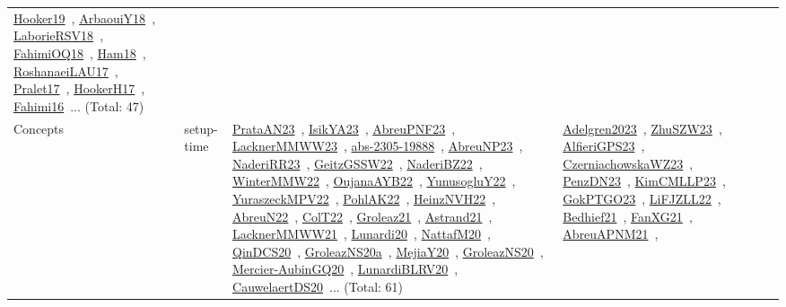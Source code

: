 {\begin{longtable}{lp{3cm}>{\raggedright\arraybackslash}p{6cm}>{\raggedright\arraybackslash}p{6cm}>{\raggedright\arraybackslash}p{8cm}}
\href{../works/Hooker19.pdf}{Hooker19}~\cite{Hooker19}, \href{../works/ArbaouiY18.pdf}{ArbaouiY18}~\cite{ArbaouiY18}, \href{../works/LaborieRSV18.pdf}{LaborieRSV18}~\cite{LaborieRSV18}, \href{../works/FahimiOQ18.pdf}{FahimiOQ18}~\cite{FahimiOQ18}, \href{../works/Ham18.pdf}{Ham18}~\cite{Ham18}, \href{../works/RoshanaeiLAU17.pdf}{RoshanaeiLAU17}~\cite{RoshanaeiLAU17}, \href{../works/Pralet17.pdf}{Pralet17}~\cite{Pralet17}, \href{../works/HookerH17.pdf}{HookerH17}~\cite{HookerH17}, \href{../works/Fahimi16.pdf}{Fahimi16}~\cite{Fahimi16}... (Total: 47)\\
Concepts & setup-time & \href{../works/PrataAN23.pdf}{PrataAN23}~\cite{PrataAN23}, \href{../works/IsikYA23.pdf}{IsikYA23}~\cite{IsikYA23}, \href{../works/AbreuPNF23.pdf}{AbreuPNF23}~\cite{AbreuPNF23}, \href{../works/LacknerMMWW23.pdf}{LacknerMMWW23}~\cite{LacknerMMWW23}, \href{../works/abs-2305-19888.pdf}{abs-2305-19888}~\cite{abs-2305-19888}, \href{../works/AbreuNP23.pdf}{AbreuNP23}~\cite{AbreuNP23}, \href{../works/NaderiRR23.pdf}{NaderiRR23}~\cite{NaderiRR23}, \href{../works/GeitzGSSW22.pdf}{GeitzGSSW22}~\cite{GeitzGSSW22}, \href{../works/NaderiBZ22.pdf}{NaderiBZ22}~\cite{NaderiBZ22}, \href{../works/WinterMMW22.pdf}{WinterMMW22}~\cite{WinterMMW22}, \href{../works/OujanaAYB22.pdf}{OujanaAYB22}~\cite{OujanaAYB22}, \href{../works/YunusogluY22.pdf}{YunusogluY22}~\cite{YunusogluY22}, \href{../works/YuraszeckMPV22.pdf}{YuraszeckMPV22}~\cite{YuraszeckMPV22}, \href{../works/PohlAK22.pdf}{PohlAK22}~\cite{PohlAK22}, \href{../works/HeinzNVH22.pdf}{HeinzNVH22}~\cite{HeinzNVH22}, \href{../works/AbreuN22.pdf}{AbreuN22}~\cite{AbreuN22}, \href{../works/ColT22.pdf}{ColT22}~\cite{ColT22}, \href{../works/Groleaz21.pdf}{Groleaz21}~\cite{Groleaz21}, \href{../works/Astrand21.pdf}{Astrand21}~\cite{Astrand21}, \href{../works/LacknerMMWW21.pdf}{LacknerMMWW21}~\cite{LacknerMMWW21}, \href{../works/Lunardi20.pdf}{Lunardi20}~\cite{Lunardi20}, \href{../works/NattafM20.pdf}{NattafM20}~\cite{NattafM20}, \href{../works/QinDCS20.pdf}{QinDCS20}~\cite{QinDCS20}, \href{../works/GroleazNS20a.pdf}{GroleazNS20a}~\cite{GroleazNS20a}, \href{../works/MejiaY20.pdf}{MejiaY20}~\cite{MejiaY20}, \href{../works/GroleazNS20.pdf}{GroleazNS20}~\cite{GroleazNS20}, \href{../works/Mercier-AubinGQ20.pdf}{Mercier-AubinGQ20}~\cite{Mercier-AubinGQ20}, \href{../works/LunardiBLRV20.pdf}{LunardiBLRV20}~\cite{LunardiBLRV20}, \href{../works/CauwelaertDS20.pdf}{CauwelaertDS20}~\cite{CauwelaertDS20}... (Total: 61) & \href{../works/Adelgren2023.pdf}{Adelgren2023}~\cite{Adelgren2023}, \href{../works/ZhuSZW23.pdf}{ZhuSZW23}~\cite{ZhuSZW23}, \href{../works/AlfieriGPS23.pdf}{AlfieriGPS23}~\cite{AlfieriGPS23}, \href{../works/CzerniachowskaWZ23.pdf}{CzerniachowskaWZ23}~\cite{CzerniachowskaWZ23}, \href{../works/PenzDN23.pdf}{PenzDN23}~\cite{PenzDN23}, \href{../works/KimCMLLP23.pdf}{KimCMLLP23}~\cite{KimCMLLP23}, \href{../works/GokPTGO23.pdf}{GokPTGO23}~\cite{GokPTGO23}, \href{../works/LiFJZLL22.pdf}{LiFJZLL22}~\cite{LiFJZLL22}, \href{../works/Bedhief21.pdf}{Bedhief21}~\cite{Bedhief21}, \href{../works/FanXG21.pdf}{FanXG21}~\cite{FanXG21}, \href{../works/AbreuAPNM21.pdf}{AbreuAPNM21}~\cite{AbreuAPNM21}, 
\end{longtable}}
